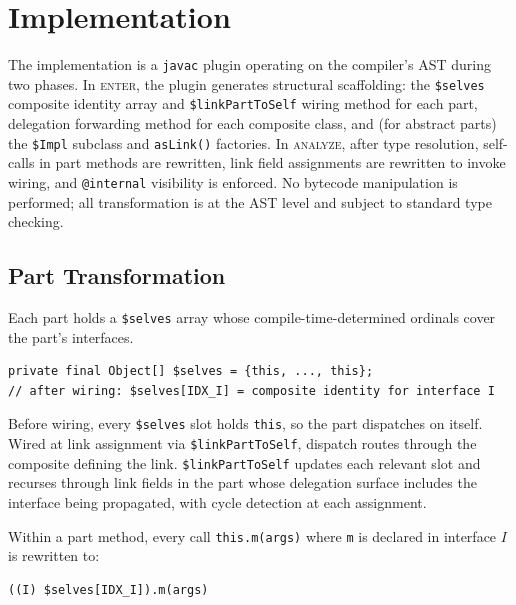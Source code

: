 \documentclass[acmsmall,nonacm]{acmart}
\theoremstyle{acmplain}
\theoremstyle{acmdefinition}
\newcommand{\code}[1]{\texttt{#1}}
\begin{document}
\section{Implementation}
\label{sec:impl}

The implementation is a \texttt{javac} plugin operating on the compiler's AST
during two phases. In \textsc{enter}, the plugin generates structural
scaffolding: the \code{\$selves} composite identity array and
\code{\$linkPartToSelf} wiring method for each part, delegation
forwarding method for each composite class, and (for abstract parts) the
\code{\$Impl} subclass and \code{asLink()} factories. In \textsc{analyze},
after type resolution, self-calls in part methods are rewritten,
link field assignments are rewritten to invoke wiring, and
\code{@internal} visibility is enforced. No bytecode manipulation is performed;
all transformation is at the AST level and subject to standard type checking.

\subsection{Part Transformation}

Each part holds a \code{\$selves} array whose compile-time-determined ordinals
cover the part's interfaces.

\begin{lstlisting}[language={},style=java]
private final Object[] $selves = {this, ..., this};
// after wiring: $selves[IDX_I] = composite identity for interface I
\end{lstlisting}

Before wiring, every \code{\$selves} slot holds \code{this}, so the part
dispatches on itself. Wired at link assignment via \code{\$linkPartToSelf}, dispatch routes
through the composite defining the link. \code{\$linkPartToSelf} updates each
relevant slot and recurses through link fields in the part whose delegation
surface includes the interface being propagated, with cycle detection at each
assignment.

Within a part method, every call \code{this.m(args)} where
\code{m} is declared in interface $I$ is rewritten to:

\begin{lstlisting}
((I) $selves[IDX_I]).m(args)
\end{lstlisting}
\end{document}
